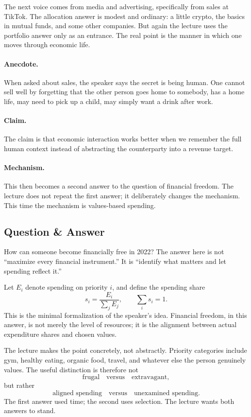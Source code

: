 The next voice comes from media and advertising, specifically from sales at TikTok. The allocation answer is modest and ordinary: a little crypto, the basics in mutual funds, and some other companies. But again the lecture uses the portfolio answer only as an entrance. The real point is the manner in which one moves through economic life.

\paragraph{Anecdote.}
When asked about sales, the speaker says the secret is being human. One cannot sell well by forgetting that the other person goes home to somebody, has a home life, may need to pick up a child, may simply want a drink after work.

\paragraph{Claim.}
The claim is that economic interaction works better when we remember the full human context instead of abstracting the counterparty into a revenue target.

\paragraph{Mechanism.}
This then becomes a second answer to the question of financial freedom. The lecture does not repeat the first answer; it deliberately changes the mechanism. This time the mechanism is values-based spending.

\subsection{Question \& Answer}

How can someone become financially free in 2022? The answer here is not ``maximize every financial instrument.'' It is ``identify what matters and let spending reflect it.''

Let \(E_i\) denote spending on priority \(i\), and define the spending share
\begin{equation}
s_i = \frac{E_i}{\sum_j E_j},
\qquad
\sum_i s_i = 1.
\end{equation}
This is the minimal formalization of the speaker's idea. Financial freedom, in this answer, is not merely the level of resources; it is the alignment between actual expenditure shares and chosen values.

The lecture makes the point concretely, not abstractly. Priority categories include gym, healthy eating, organic food, travel, and whatever else the person genuinely values. The useful distinction is therefore not
\[
\text{frugal} \quad \text{versus} \quad \text{extravagant},
\]
but rather
\[
\text{aligned spending} \quad \text{versus} \quad \text{unexamined spending}.
\]
The first answer used time; the second uses selection. The lecture wants both answers to stand.

